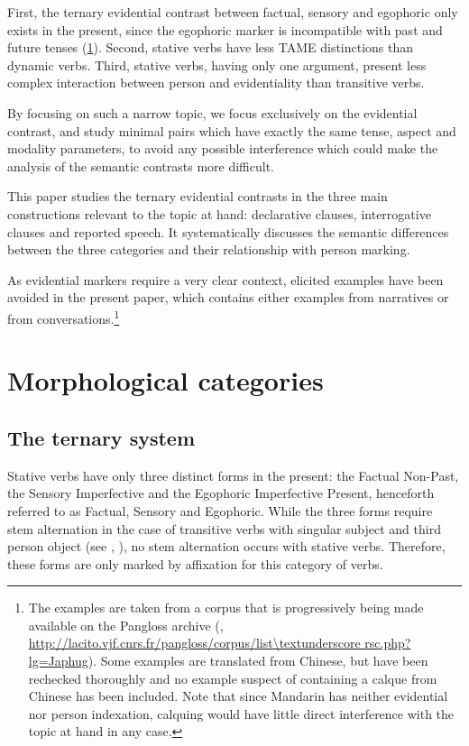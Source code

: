 \documentclass[oldfontcommands,oneside,a4paper,11pt]{article}
\begin{document}
First, the ternary evidential contrast between factual, sensory and egophoric only exists in the present, since the egophoric marker is incompatible with past and future tenses (\ref{sec:morph}). Second, stative verbs have less TAME distinctions than dynamic verbs. Third, stative verbs, having only one argument, present less complex interaction between person and evidentiality than transitive verbs.

By focusing on such a narrow topic, we focus exclusively on the evidential contrast, and study minimal pairs which have exactly the same tense, aspect and modality parameters, to avoid any possible interference which could make the analysis of the semantic contrasts more difficult.

This paper studies the ternary evidential contrasts in the three main constructions relevant to the topic at hand: declarative clauses, interrogative clauses and reported speech. It systematically discusses the semantic differences between the three categories and their relationship with person marking. %

As evidential markers require a very clear context, elicited examples have been avoided in the present paper, which contains either examples from narratives or from conversations.\footnote{ The examples are taken from a corpus that is progressively being made available on the Pangloss archive  (\citealt{michailovsky14pangloss}, 
 \url{http://lacito.vjf.cnrs.fr/pangloss/corpus/list\textunderscore rsc.php?lg=Japhug}). Some examples are translated from Chinese, but have been rechecked thoroughly and no example suspect of containing a calque from Chinese has been included. Note that since Mandarin has neither evidential nor person indexation, calquing would have little direct interference with the topic at hand in any case.}

\section{Morphological categories} \label{sec:morph}

\subsection{The ternary system}
Stative verbs have only three distinct forms in the present: the Factual Non-Past, the Sensory Imperfective and the Egophoric Imperfective Present, henceforth referred to as Factual, Sensory and Egophoric. While the three forms require stem alternation in the case of transitive verbs with singular subject and third person object (see \citealt{jackson00sidaba}, \citealt[267]{jacques14linking}), no stem alternation occurs with stative verbs. Therefore, these forms are only marked by affixation for this category of verbs.
\end{document}
